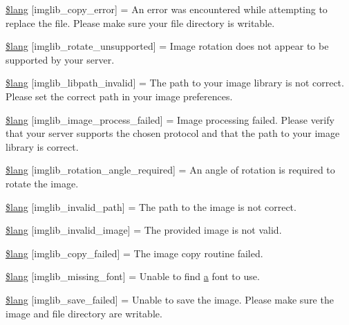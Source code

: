 \begin{DoxyCompactItemize}
\item 
\mbox{\hyperlink{imglib__lang_8php_abf9cda6847900e32a88f69ba0dc9a3f7}{\$lang}} \mbox{[}\textquotesingle{}imglib\+\_\+copy\+\_\+error\textquotesingle{}\mbox{]} = \textquotesingle{}An error was encountered while attempting to replace the file. Please make sure your file directory is writable.\textquotesingle{}
\item 
\mbox{\hyperlink{imglib__lang_8php_a45c4d46adade179aadaf31c3308dc817}{\$lang}} \mbox{[}\textquotesingle{}imglib\+\_\+rotate\+\_\+unsupported\textquotesingle{}\mbox{]} = \textquotesingle{}Image rotation does not appear to be supported by your server.\textquotesingle{}
\item 
\mbox{\hyperlink{imglib__lang_8php_ab93fcb81657fb28dae58c301fd86c239}{\$lang}} \mbox{[}\textquotesingle{}imglib\+\_\+libpath\+\_\+invalid\textquotesingle{}\mbox{]} = \textquotesingle{}The path to your image library is not correct. Please set the correct path in your image preferences.\textquotesingle{}
\item 
\mbox{\hyperlink{imglib__lang_8php_acd4bea80f16165e3fdacec4ef52098ba}{\$lang}} \mbox{[}\textquotesingle{}imglib\+\_\+image\+\_\+process\+\_\+failed\textquotesingle{}\mbox{]} = \textquotesingle{}Image processing failed. Please verify that your server supports the chosen protocol and that the path to your image library is correct.\textquotesingle{}
\item 
\mbox{\hyperlink{imglib__lang_8php_afc1a67705ef93541c57cabf37cac3502}{\$lang}} \mbox{[}\textquotesingle{}imglib\+\_\+rotation\+\_\+angle\+\_\+required\textquotesingle{}\mbox{]} = \textquotesingle{}An angle of rotation is required to rotate the image.\textquotesingle{}
\item 
\mbox{\hyperlink{imglib__lang_8php_ae146581692445d50a6f29581c9a1b829}{\$lang}} \mbox{[}\textquotesingle{}imglib\+\_\+invalid\+\_\+path\textquotesingle{}\mbox{]} = \textquotesingle{}The path to the image is not correct.\textquotesingle{}
\item 
\mbox{\hyperlink{imglib__lang_8php_a77429a4b0abf12636c198786dc433995}{\$lang}} \mbox{[}\textquotesingle{}imglib\+\_\+invalid\+\_\+image\textquotesingle{}\mbox{]} = \textquotesingle{}The provided image is not valid.\textquotesingle{}
\item 
\mbox{\hyperlink{imglib__lang_8php_a6261cfa91f0799188d8dcc0ba86180c5}{\$lang}} \mbox{[}\textquotesingle{}imglib\+\_\+copy\+\_\+failed\textquotesingle{}\mbox{]} = \textquotesingle{}The image copy routine failed.\textquotesingle{}
\item 
\mbox{\hyperlink{imglib__lang_8php_a6252e9edf6d856814555f9de3eedc8da}{\$lang}} \mbox{[}\textquotesingle{}imglib\+\_\+missing\+\_\+font\textquotesingle{}\mbox{]} = \textquotesingle{}Unable to find \mbox{\hyperlink{interfacea}{a}} font to use.\textquotesingle{}
\item 
\mbox{\hyperlink{imglib__lang_8php_a66c0d059360c1bd908fe612f9b3bf917}{\$lang}} \mbox{[}\textquotesingle{}imglib\+\_\+save\+\_\+failed\textquotesingle{}\mbox{]} = \textquotesingle{}Unable to save the image. Please make sure the image and file directory are writable.\textquotesingle{}
\end{DoxyCompactItemize}


